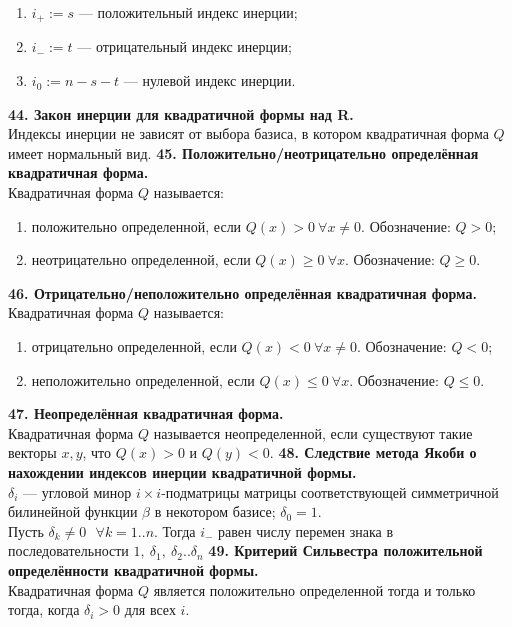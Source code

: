 \documentclass{article}
\begin{document}
\begin{enumerate}
\item $i_+ := s$ --- положительный индекс инерции;
\item $i_- := t$ --- отрицательный индекс инерции;
\item $i_0 := n - s - t$ --- нулевой индекс инерции.
\end{enumerate}
\textbf{44. Закон инерции для квадратичной формы над R.}\\
Индексы инерции не зависят от выбора базиса, в котором квадратичная форма $Q$ имеет нормальный вид.
\newline
\newline
\textbf{45. Положительно/неотрицательно определённая квадратичная форма.}\\
Квадратичная форма $Q$ называется:
\begin{enumerate}
\item положительно определенной, если $Q(x) > 0\ \forall x \neq 0$. Обозначение: $Q > 0$;
\item неотрицательно определенной, если $Q(x) \geqslant 0\ \forall x$. Обозначение: $Q \geqslant 0$.
\end{enumerate}
\textbf{46. Отрицательно/неположительно определённая квадратичная форма.}\\
Квадратичная форма $Q$ называется:
\begin{enumerate}
\item отрицательно определенной, если $Q(x) < 0\  \forall x \neq 0$. Обозначение: $Q < 0$;
\item неположительно определенной, если $Q(x) \leqslant 0\ \forall x$. Обозначение: $Q \leqslant 0$.
\end{enumerate}
\textbf{47. Неопределённая квадратичная форма.}\\
Квадратичная форма $Q$ называется неопределенной, если существуют такие векторы $x, y$, что $Q(x) > 0$ и $Q(y) < 0$.
\newline
\newline
\textbf{48. Следствие метода Якоби о нахождении индексов инерции квадратичной формы.}\\
$\delta_i$ --- угловой минор $i\times i$-подматрицы матрицы соответствующей симметричной билинейной функции $\beta$ в некотором базисе; $\delta_0 = 1$.\\
Пусть $\delta_k\neq0 ~~~\forall k=1..n$. Тогда $i_-$ равен числу перемен знака в последовательности $1,~\delta_1,~\delta_2..\delta_n$ 
\newline
\newline
\textbf{49. Критерий Сильвестра положительной определённости квадратичной формы.}\\
Квадратичная форма $Q$ является положительно определенной тогда и только тогда, когда $\delta_i > 0$  для всех $i$.
\end{document}
